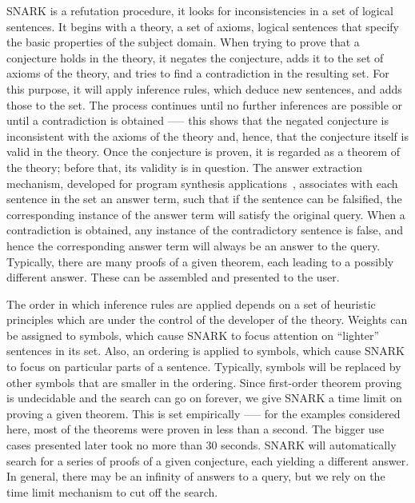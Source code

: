 SNARK is a refutation procedure, \ie it looks for inconsistencies in a set of logical sentences. It begins with a theory, a set of axioms, \ie logical sentences that specify the basic properties of the subject domain. 
When trying to prove that a conjecture holds in the theory, it negates the conjecture, adds it to the set of axioms of the theory, and tries to find a contradiction in the resulting set. 
For this purpose, it will apply inference rules, which deduce new sentences, and adds those to the set. The process continues until no further inferences are possible or until a contradiction is obtained \-—-- this shows that the negated conjecture is inconsistent with the axioms of the theory and, hence, that the conjecture itself is valid in the theory. 
Once the conjecture is proven, it is regarded as a theorem of the theory; before that, its validity is in question.
The answer extraction mechanism, developed for program synthesis applications~\cite{Manna:1980:DAP:357084.357090}, associates with each sentence in the set an answer term, such that if the sentence can be falsified, the corresponding instance of the answer term will satisfy the original query. 
When a contradiction is obtained, any instance of the contradictory sentence is false, and hence the corresponding answer term will always  be an answer to the query. 
Typically, there are many proofs of a given theorem, each leading to a possibly different answer. 
These can be assembled and presented to the user.

The order in which inference rules are applied depends on a set of heuristic principles which are under the control of the developer of the theory. 
Weights can be assigned to symbols, which cause SNARK to focus attention on “lighter” sentences in its set. 
Also, an ordering is applied to symbols, which cause SNARK to focus on particular parts of a sentence. 
Typically, symbols will be replaced by other symbols that are smaller in the ordering. 
Since first-order theorem proving is undecidable and the search can go on forever, we give SNARK a time limit on proving a given theorem. 
This is set empirically \-—-- for the examples considered here, most of the theorems were proven in less than a second. The bigger use cases presented later took no more than 30 seconds.
SNARK will automatically search for a series of proofs of a given conjecture, each yielding a different answer.
In general, there may be an infinity of answers to a query, but we rely on the time limit mechanism to cut off the search.


